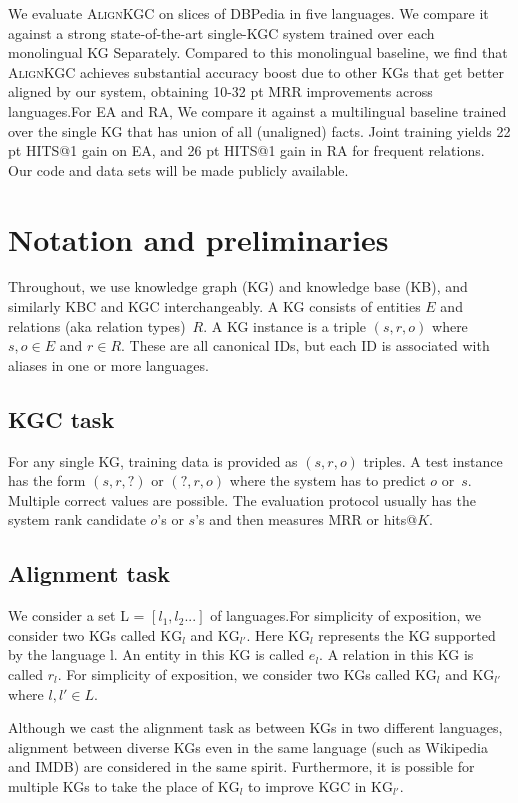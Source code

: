\documentclass[11pt]{article}
\def\KG{\ensuremath{\text{KG}}}
\def\shortname{\textsc{Align\-KGC}}
\begin{document}
We evaluate \shortname{} on slices of DBPedia in five languages.  We compare it against a strong state-of-the-art single-KGC system trained over each monolingual KG Separately. Compared to this monolingual baseline, we find that \shortname{} achieves substantial accuracy boost due to other KGs that get better aligned by our system, obtaining 10-32 pt MRR improvements across languages.For EA and RA, We compare it against a multilingual baseline trained over the single KG that has union of all (unaligned) facts. Joint training yields 22 pt HITS@1 gain on EA, and 26 pt HITS@1 gain in RA for frequent relations. Our code and data sets will be made publicly available.


\section{Notation and preliminaries}
\label{sec:Prelims}

Throughout, we use knowledge graph (KG) and knowledge base (KB), and similarly KBC and KGC interchangeably.  A KG consists of entities $E$ and relations (aka relation types)~$R$.  A KG instance is a triple $(s,r,o)$ where $s,o\in E$ and $r\in R$.  These are all canonical IDs, but each ID is associated with aliases in one or more languages.


\subsection{KGC task}

For any single KG, training data is provided as $(s,r,o)$ triples.  A test instance has the form $(s,r,?)$ or $(?,r,o)$ where the system has to predict $o$ or~$s$.  Multiple correct values are possible.  The evaluation protocol usually has the system rank candidate $o$'s or $s$'s and then measures MRR or hits@$K$.


\subsection{Alignment task}

We consider a set L = ${[l_1, l_2...]}$ of languages.For simplicity of exposition, we consider two KGs called $\KG_{l}$ and $\KG_{l'}$.  Here $\KG_{l}$ represents the KG supported by the language l.  An entity in this KG is called $e_{l}$.  A relation in this KG is called $r_{l}$. For simplicity of exposition, we consider two KGs called $\KG_{l}$ and $\KG_{l'}$ where $l,l' \in L$.


Although we cast the alignment task as between KGs in two different languages, alignment between diverse KGs even in the same language (such as Wikipedia and IMDB) are considered in the same spirit.  Furthermore, it is possible for multiple KGs to take the place of $\KG_{l}$ to improve KGC in $\KG_{l'}$.
\end{document}
